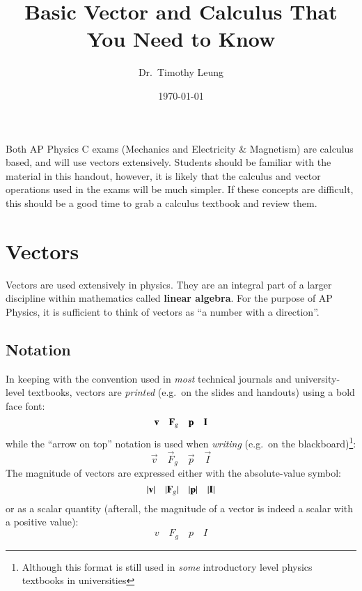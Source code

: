 \documentclass{../../../oss-handout}
\title{Basic Vector and Calculus That You Need to Know}
\author{Dr.\ Timothy Leung}
\date{\today}
\newcommand{\mb}[1]{\ensuremath\mathbf{#1}}
\begin{document}
\thispagestyle{title}
\gentitle


Both AP Physics C exams (Mechanics and Electricity \& Magnetism) are calculus
based, and will use vectors extensively.
Students should be familiar with the material in this handout, however, it is
likely that the calculus and vector operations used in the exams will be much
simpler. If these concepts are difficult, this should be a good time to grab a
calculus textbook and review them.

\section{Vectors}
Vectors are used extensively in physics. They are an integral part of a larger
discipline within mathematics called \textbf{linear algebra}. For the purpose
of AP Physics, it is sufficient to think of vectors as
``a number with a direction''.

\subsection{Notation}
In keeping with the convention used in \emph{most} technical journals and
university-level textbooks, vectors are \emph{printed} (e.g.\ on the slides and
handouts) using a bold face font:
\begin{equation*}
  \mb{v}\quad\mb{F}_g\quad\mb{p}\quad\mb{I}
\end{equation*}
while the ``arrow on top'' notation is used when \emph{writing} (e.g.\ on the
blackboard)\footnote{Although this format is still used in \emph{some}
  introductory level physics textbooks in universities}:
\begin{equation*}
  \vec{v}\quad\vec{F}_g\quad\vec{p}\quad\vec{I}
\end{equation*}
The magnitude of vectors are expressed either with the absolute-value symbol:
\begin{equation*}
  |\mb{v}|\quad|\mb{F}_g|\quad|\mb{p}|\quad|\mb{I}|
\end{equation*}
or as a scalar quantity (afterall, the magnitude of a vector is indeed a scalar
with a positive value):
\begin{equation*}
  v\quad F_g\quad p \quad I
\end{equation*}
\end{document}
